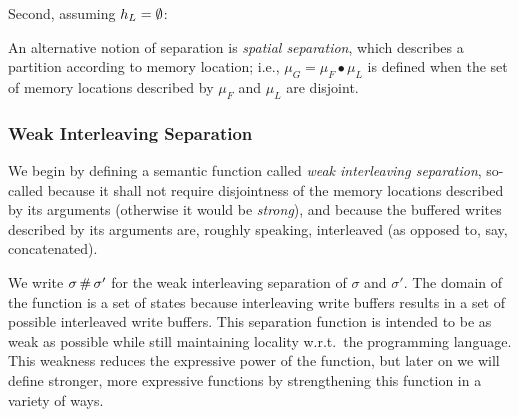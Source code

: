 \documentclass[11pt]{report}
\begin{document}
 Second, assuming $h_L = \operatorname{\emptyset}$: 

An alternative notion of separation is \emph{spatial separation}, which describes a partition according to memory location; i.e., $\mu_G = \mu_F \bullet \mu_L$ is defined when the set of memory locations described by $\mu_F$ and $\mu_L$ are disjoint. 


\subsubsection{Weak Interleaving Separation}

We begin by defining a semantic function called \emph{weak interleaving separation}, so-called because it shall not require disjointness of the memory locations described by its arguments (otherwise it would be \emph{strong}), and because the buffered writes described by its arguments are, roughly speaking, interleaved (as opposed to, say, concatenated). 

We write $\sigma \operatorname{\#} \sigma'$ for the weak interleaving separation of $\sigma$ and $\sigma'$. The domain of the function is a set of states because interleaving write buffers results in a set of possible interleaved write buffers. This separation function is intended to be as weak as possible while still maintaining locality w.r.t.\ the programming language. This weakness reduces the expressive power of the function, but later on we will define stronger, more expressive functions by strengthening this function in a variety of ways. 
\end{document}
